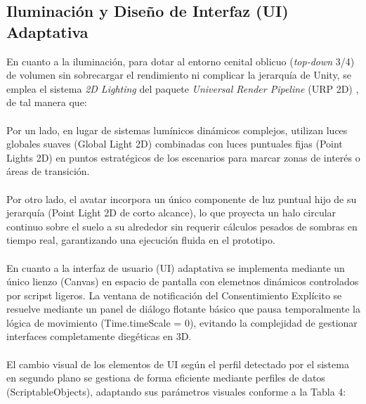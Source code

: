 \subsection{Iluminación y Diseño de Interfaz (UI) Adaptativa}
En cuanto a la iluminación, para dotar al entorno cenital oblicuo (\textit{top-down} 3/4) de volumen sin sobrecargar el rendimiento ni complicar la jerarquía de Unity, se emplea el sistema \textit{2D Lighting} del paquete \textit{Universal Render Pipeline} (\ac{URP} 2D) \parencite{unity2023}, de tal manera que:
\\\\
Por un lado, en lugar de sistemas lumínicos dinámicos complejos, utilizan luces globales suaves (Global Light 2D) combinadas con luces puntuales fijas (Point Lights 2D) en puntos estratégicos de los escenarios para marcar zonas de interés o áreas de transición.
\\\\
Por otro lado, el avatar incorpora un único componente de luz puntual hijo de su jerarquía (Point Light 2D de corto alcance), lo que proyecta un halo circular continuo sobre el suelo a su alrededor sin requerir cálculos pesados de sombras en tiempo real, garantizando una ejecución fluida en el prototipo.
\\\\
En cuanto a la interfaz de usuario (UI) adaptativa se implementa mediante un único lienzo (Canvas) en espacio de pantalla con elemetnos dinámicos controlados por scripst ligeros. La ventana de notificación del Consentimiento Explícito se resuelve mediante un panel de diálogo flotante básico que pausa temporalmente la lógica de movimiento (Time.timeScale = 0), evitando la complejidad de gestionar interfaces completamente diegéticas en 3D.
\\\\
El cambio visual de los elementos de UI según el perfil detectado por el sistema en segundo plano se gestiona de forma eficiente mediante perfiles de datos (ScriptableObjects), adaptando sus parámetros visuales conforme a la Tabla 4:

